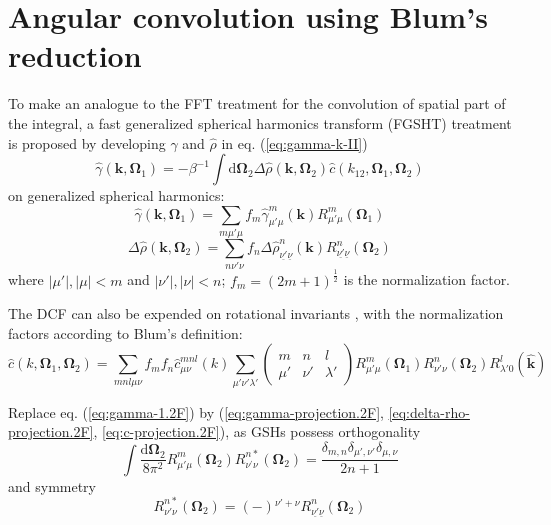 
\chapter{Angular convolution using Blum's reduction\label{chpt:deduction_blum}}

To make an analogue to the \acs{FFT} treatment for the convolution
of spatial part of the integral, a fast generalized spherical harmonics
transform (\acs{FGSHT}) treatment is proposed by developing $\hat{\gamma}$
and $\hat{\rho}$ in eq. (\ref{eq:gamma-k-II})
\begin{equation}
\hat{\gamma}(\mathbf{k},\mathbf{\Omega}_{1})=-\beta^{-1}\int\mathrm{d}\mathbf{\Omega}_{2}\Delta\hat{\rho}(\mathbf{k},\mathbf{\Omega}_{2})\hat{c}(k_{12},\mathbf{\Omega}_{1},\mathbf{\Omega}_{2})\label{eq:gamma-1.2F}
\end{equation}
on generalized spherical harmonics:
\begin{equation}
\hat{\gamma}(\mathbf{k},\mathbf{\Omega}_{1})=\sum_{m\mu'\mu}f_{m}\hat{\gamma}_{\mu'\mu}^{m}(\mathbf{k})R_{\mu'\mu}^{m}(\mathbf{\Omega}_{1})\label{eq:gamma-projection.2F}
\end{equation}
\begin{equation}
\Delta\hat{\rho}(\mathbf{k},\mathbf{\Omega}_{2})=\sum_{n\nu'\nu}f_{n}\Delta\hat{\rho}_{\underline{\nu'}\underline{\nu}}^{n}(\mathbf{k})R_{\underline{\nu'}\underline{\nu}}^{n}(\mathbf{\Omega}_{2})\label{eq:delta-rho-projection.2F}
\end{equation}
where $\left|\mu'\right|,\left|\mu\right|<m$ and $\left|\nu'\right|,\left|\nu\right|<n$;
$f_{m}=\left(2m+1\right)^{\frac{1}{2}}$ is the normalization factor.

The \acs{DCF} can also be expended on rotational invariants \citep{Blum_I},
with the normalization factors according to Blum's definition:
\begin{equation}
\hat{c}(k,\mathbf{\Omega}_{1},\mathbf{\Omega}_{2})=\sum_{mnl\mu\nu}f_{m}f_{n}\hat{c}_{\mu\nu}^{mnl}(k)\sum_{\mu'\nu'\lambda'}\left(\begin{array}{ccc}
m & n & l\\
\mu' & \nu' & \lambda'
\end{array}\right)R_{\mu'\mu}^{m}(\mathbf{\Omega}_{1})R_{\nu'\nu}^{n}(\mathbf{\Omega}_{2})R_{\lambda'0}^{l}(\hat{\mathbf{k}})\label{eq:c-projection.2F}
\end{equation}

Replace eq. (\ref{eq:gamma-1.2F}) by (\ref{eq:gamma-projection.2F},
\ref{eq:delta-rho-projection.2F}, \ref{eq:c-projection.2F}), as
\acs{GSH}s possess orthogonality \citep{Gray-Gubbins,Messiah}
\begin{equation}
\int\frac{\mathrm{d}\mathbf{\Omega}_{2}}{8\pi^{2}}R_{\mu'\mu}^{m}(\mathbf{\Omega}_{2})R_{\nu{}^{'}\nu}^{n*}(\mathbf{\Omega}_{2})=\frac{\delta_{m,n}\delta_{\mu',\nu'}\delta_{\mu,\nu}}{2n+1}
\end{equation}
and symmetry
\begin{equation}
R_{\nu'\nu}^{n*}(\mathbf{\Omega}_{2})=\left(-\right){}^{\nu'+\nu}R_{\underline{\nu'}\underline{\nu}}^{n}(\mathbf{\Omega}_{2})\label{eq:symm-gsh.2F}
\end{equation}

